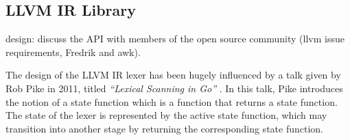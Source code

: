 
\subsection{LLVM IR Library}
\label{sec:impl_llvm_ir_library}







design: discuss the API with members of the open source community (llvm issue requirements, Fredrik and awk).

The design of the LLVM IR lexer has been hugely influenced by a talk given by Rob Pike in 2011, titled \textit{``Lexical Scanning in Go''} \cite{lexical_scanning_in_go}. In this talk, Pike introduces the notion of a state function which is a function that returns a state function. The state of the lexer is represented by the active state function, which may transition into another stage by returning the corresponding state function.

